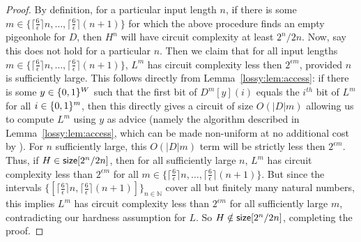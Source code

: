 \begin{proof}
By definition, for a particular input length $n$, if there is some $m \in \{\lceil \frac{6}{\epsilon} \rceil n, \ldots, \lceil \frac{6}{\epsilon} \rceil (n+1)\}$ for which the above procedure finds an empty pigeonhole for $D$, then $H^n$ will have circuit complexity at least $2^n/2n$. Now, say this does not hold for a particular $n$. Then we claim that for all input lengths $m \in \{\lceil \frac{6}{\epsilon} \rceil n, \ldots, \lceil \frac{6}{\epsilon} \rceil (n+1)\}$, $L^m$ has circuit complexity less then $2^{\epsilon m}$, provided $n$ is sufficiently large. This follows directly from Lemma~\ref{lossy:lem:access}: if there is some $y \in \{0,1\}^W$ such that the first bit of $D^m[y](i)$ equals the $i^{th}$ bit of $L^m$ for all $i \in \{0,1\}^m$, then this directly gives a circuit of size $O(|D|m)$ allowing us to compute $L^m$ using $y$ as advice (namely the algorithm described in Lemma~\ref{lossy:lem:access}, which can be made non-uniform at no additional cost by \cite{Korten}). For $n$ sufficiently large, this $O(|D|m)$ term  will be strictly less then $2^{\epsilon m}$. Thus, if $H \in \cl{size}[2^n/2n]$, then for all sufficiently large $n$, $L^m $ has circuit complexity less than $2^{\epsilon m}$ for all $m \in  \{\lceil \frac{6}{\epsilon} \rceil n, \ldots, \lceil \frac{6}{\epsilon} \rceil (n+1)\}$. But since the intervals $\{[\lceil \frac{6}{\epsilon} \rceil n, \lceil \frac{6}{\epsilon} \rceil (n+1)]\}_{n \in \mathbb{N}}$ cover all but finitely many natural numbers, this implies $L^m$ has circuit complexity less than $2^{\epsilon m}$ for all sufficiently large $m$, contradicting our hardness assumption for $L$. So $H \notin \cl{size}[2^n/2n]$, completing the proof.
\end{proof}
